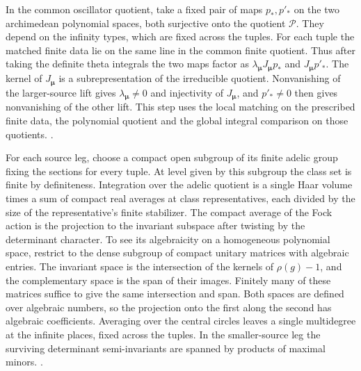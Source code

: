 In the common oscillator quotient, take a fixed pair of maps
\(p_*,p'_*\) on the two archimedean polynomial spaces, both
surjective onto the quotient \(\mathcal P\). They depend on the
infinity types, which are fixed across the tuples. For each tuple
the matched finite data lie on the same line in the common finite
quotient. Thus after taking the definite theta integrals the two
maps factor as \(\lambda_{\boldsymbol\mu}J_{\boldsymbol\mu}p_*\)
and \(J_{\boldsymbol\mu}p'_*\). The kernel of
\(J_{\boldsymbol\mu}\) is a subrepresentation of the irreducible
quotient. Nonvanishing of the larger-source lift gives
\(\lambda_{\boldsymbol\mu}\ne0\) and injectivity of
\(J_{\boldsymbol\mu}\), and \(p'_*\ne0\) then gives nonvanishing of
the other lift. This step uses the local matching on the prescribed
finite data, the polynomial quotient and the global integral
comparison on those quotients.
.

For each source leg, choose a compact open subgroup of its finite
adelic group fixing the sections for every tuple. At level given by
this subgroup the class set is finite by definiteness. Integration
over the adelic quotient is a single Haar volume times a sum of
compact real averages at class representatives, each divided by
the size of the representative's finite stabilizer. The compact
average of the Fock action is the projection to the invariant
subspace after twisting by the determinant character. To see its
algebraicity on a homogeneous polynomial space, restrict to the
dense subgroup of compact unitary matrices with algebraic entries.
The invariant space is the intersection of the kernels of
\(\rho(g)-1\), and the complementary space is the span of their
images. Finitely many of these matrices suffice to give the same
intersection and span. Both spaces are defined over algebraic
numbers, so the projection onto the first along the second has
algebraic coefficients. Averaging over the central circles leaves
a single multidegree at the infinite places, fixed across the
tuples. In the smaller-source leg the surviving determinant
semi-invariants are spanned by products of maximal minors.
.

